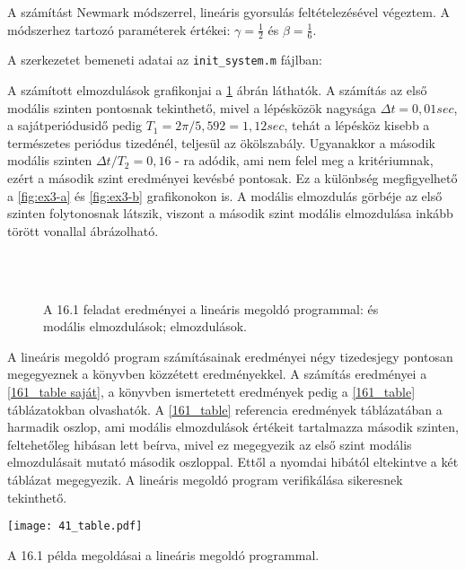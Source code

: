 A számítást Newmark módszerrel, lineáris gyorsulás feltételezésével végeztem. A módszerhez tartozó paraméterek értékei: $\gamma = \frac{1}{2}$ és $\beta = \frac{1}{6}$.

A szerkezetet bemeneti adatai az \verb|init_system.m| fájlban:



A számított elmozdulások grafikonjai a \ref{fig:ex3} ábrán láthatók. A számítás az első modális szinten pontosnak tekinthető, mivel a lépésközök nagysága $\Delta{t} = 0,01 sec$, a sajátperiódusidő pedig $T_1 = 2\pi/5,592 = 1,12 sec$, tehát a lépésköz kisebb a természetes periódus tizedénél, teljesül az ökölszabály. Ugyanakkor a második modális szinten $\Delta{t}/T_2 = 0,16$ - ra adódik, ami nem felel meg a kritériumnak, ezért a második szint eredményei kevésbé pontosak. Ez a különbség megfigyelhető a  \ref{fig:ex3-a} és   \ref{fig:ex3-b} grafikonokon is. A modális elmozdulás görbéje az első szinten folytonosnak látszik, viszont a második szint modális elmozdulása inkább törött vonallal ábrázolható. 
 
\begin{figure}[h!b]%
\centering
{}%
\\
%
\\
%
\caption[A \cite{chopra} 16.1 feladat eredményei a lineáris megoldó programmal.]{A \cite{chopra} 16.1 feladat eredményei a lineáris megoldó programmal:
 és   modális elmozdulások;
 elmozdulások.}%
\label{fig:ex3}%
\end{figure}

A lineáris megoldó program számításainak eredményei négy tizedesjegy pontosan megegyeznek a könyvben közzétett eredményekkel. A számítás eredményei a \ref{161_table saját}, a könyvben ismertetett eredmények pedig a \ref{161_table} táblázatokban olvashatók. A \ref{161_table} referencia eredmények táblázatában a harmadik oszlop, ami modális elmozdulások  értékeit tartalmazza második szinten, feltehetőleg hibásan lett beírva, mivel ez megegyezik az első szint modális elmozdulásait mutató második oszloppal. Ettől a nyomdai hibától eltekintve a két táblázat megegyezik. A lineáris megoldó program verifikálása sikeresnek tekinthető.

\begin{table}[p]
\centering
\texttt{[image: 41\_table.pdf]}
\caption{A \cite{chopra} 16.1 példa megoldásai a lineáris megoldó programmal.}
\label{161_table saját}
\end{table}

